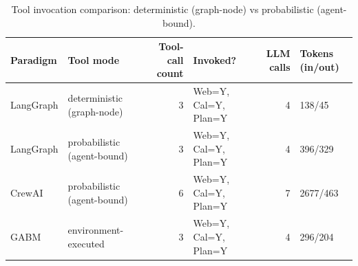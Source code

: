 \begin{table}[h]
\centering
\caption{Tool invocation comparison: deterministic (graph-node) vs probabilistic (agent-bound).}
\begin{tabular}{llrlrl}
\toprule
Paradigm & Tool mode & Tool-call count & Invoked? & LLM calls & Tokens (in/out) \\
\midrule
LangGraph & deterministic (graph-node) & 3 & Web=Y, Cal=Y, Plan=Y & 4 & 138/45 \\
LangGraph & probabilistic (agent-bound) & 3 & Web=Y, Cal=Y, Plan=Y & 4 & 396/329 \\
CrewAI & probabilistic (agent-bound) & 6 & Web=Y, Cal=Y, Plan=Y & 7 & 2677/463 \\
GABM & environment-executed & 3 & Web=Y, Cal=Y, Plan=Y & 4 & 296/204 \\
\bottomrule
\end{tabular}
\end{table}
